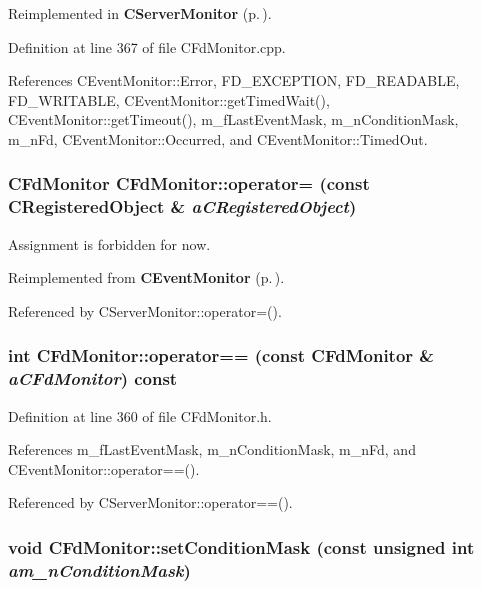 Reimplemented in {\bf CServer\-Monitor} {\rm (p.\,\pageref{classCServerMonitor_a7})}.

Definition at line 367 of file CFd\-Monitor.cpp.

References CEvent\-Monitor::Error, FD\_\-EXCEPTION, FD\_\-READABLE, FD\_\-WRITABLE, CEvent\-Monitor::get\-Timed\-Wait(), CEvent\-Monitor::get\-Timeout(), m\_\-f\-Last\-Event\-Mask, m\_\-n\-Condition\-Mask, m\_\-n\-Fd, CEvent\-Monitor::Occurred, and CEvent\-Monitor::Timed\-Out.
\subsubsection{\setlength{\rightskip}{0pt plus 5cm}CFd\-Monitor CFd\-Monitor::operator= (const {\bf CRegistered\-Object} \& {\em a\-CRegistered\-Object})\hspace{0.3cm}{\tt  [private]}}\label{classCFdMonitor_c1}


Assignment is forbidden for now.



Reimplemented from {\bf CEvent\-Monitor} {\rm (p.\,\pageref{classCEventMonitor_c1})}.

Referenced by CServer\-Monitor::operator=().
\subsubsection{\setlength{\rightskip}{0pt plus 5cm}int CFd\-Monitor::operator== (const CFd\-Monitor \& {\em a\-CFd\-Monitor}) const\hspace{0.3cm}{\tt  [inline]}}\label{classCFdMonitor_a3}




Definition at line 360 of file CFd\-Monitor.h.

References m\_\-f\-Last\-Event\-Mask, m\_\-n\-Condition\-Mask, m\_\-n\-Fd, and CEvent\-Monitor::operator==().

Referenced by CServer\-Monitor::operator==().
\subsubsection{\setlength{\rightskip}{0pt plus 5cm}void CFd\-Monitor::set\-Condition\-Mask (const unsigned int {\em am\_\-n\-Condition\-Mask})\hspace{0.3cm}{\tt  [inline, protected]}}\label{classCFdMonitor_b1}




